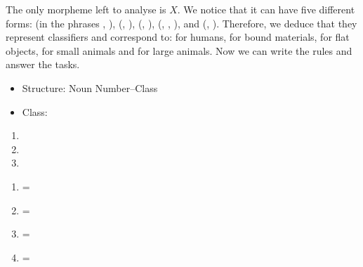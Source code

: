 \begin{refsection}
\begin{mysolution}
 The only morpheme left to analyse is $X$. We notice that it can have five different forms:  (in the phrases , ),  (, ),  (, ),  (, , ), and  (, ). Therefore, we deduce that they represent classifiers and correspond to:  for humans,  for bound materials,  for flat objects,  for small animals and  for large animals. Now we can write the rules and answer the tasks.

\begin{itemize}
    \item Structure: Noun Number--Class
    \item Class:
    \begin{itemize}
    \end{itemize}
\end{itemize}

\begin{solutions}
    \item \begin{enumerate}[leftmargin=0pt]
            \item[] 
            \item[] 
            \item[] 
            \end{enumerate}
    \item \begin{enumerate}[leftmargin=0pt]
                \item[]  = 
                \item[]  = 
                \item[]  = 
                \item[]  = 
        \end{enumerate}
\end{solutions}
\end{mysolution}


\end{refsection}
